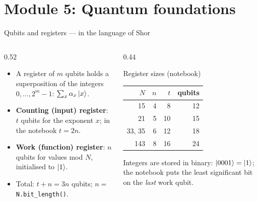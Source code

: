 \documentclass[aspectratio=169,11pt]{beamer}
\newcommand{\key}[1]{{\color{qdark}\textbf{#1}}}
\begin{document}
\section{Module 5: Quantum foundations}
\begin{frame}[label=fRegisters]{Qubits and registers --- in the language of Shor}
  \begin{columns}[T]
    \begin{column}{0.52\textwidth}
      \small
      \begin{itemize}\itemsep1pt
        \item A register of $m$ qubits holds a superposition of the integers $0, \dots, 2^m - 1$: $\sum_x\alpha_x\ket x$.
        \item \key{Counting (input) register}: $t$ qubits for the exponent $x$; in the notebook $t = 2n$.
        \item \key{Work (function) register}: $n$ qubits for values mod $N$, initialised to $\ket1$.
        \item Total: $t + n = 3n$ qubits; $n = $ \texttt{N.bit\_length()}.
      \end{itemize}
    \end{column}
    \begin{column}{0.44\textwidth}
      \begin{exampleblock}{Register sizes (notebook)}
        \scriptsize
        \begin{tabular}{@{}rrrr@{}}
          $N$ & $n$ & $t$ & qubits\\ \midrule
          15 & 4 & 8 & 12\\
          21 & 5 & 10 & 15\\
          33, 35 & 6 & 12 & 18\\
          143 & 8 & 16 & 24
        \end{tabular}
      \end{exampleblock}
      \scriptsize Integers are stored in binary: $\ket{0001} = \ket1$; the notebook puts the least significant bit on the \emph{last} work qubit.
    \end{column}
  \end{columns}
\end{frame}
\end{document}
